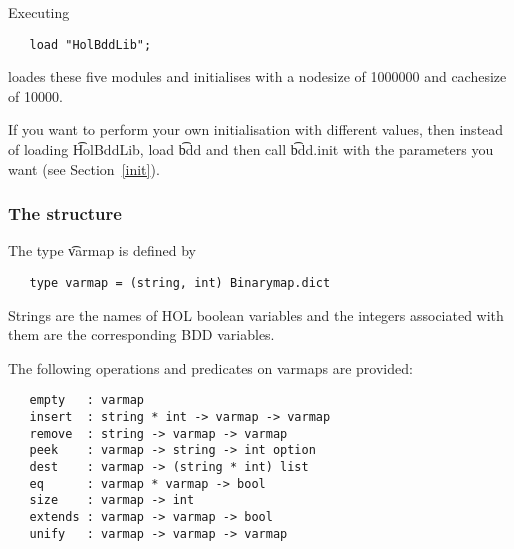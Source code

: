 Executing

\vspace*{-2mm}

\begin{verbatim}
   load "HolBddLib";
\end{verbatim}

\vspace*{-2mm}

loades these five modules and
initialises \Buddy{} with a nodesize of 1000000
and cachesize of 10000.  

If you want to perform your own \Buddy{} initialisation with different
values, then instead of loading \t{HolBddLib}, load \t{bdd} and then
call \t{bdd.init} with the parameters you want (see Section~\ref{init}).  

\subsubsection{The structure }\label{Varmap}

The type \t{varmap} is defined by

\vspace*{-2mm}

\begin{verbatim}
   type varmap = (string, int) Binarymap.dict
\end{verbatim}

\vspace*{-2mm}

Strings are the names of HOL boolean variables and the integers associated with them
are the corresponding BDD variables.

The following operations and predicates on varmaps are provided:

\begin{verbatim}
   empty   : varmap
   insert  : string * int -> varmap -> varmap
   remove  : string -> varmap -> varmap
   peek    : varmap -> string -> int option
   dest    : varmap -> (string * int) list
   eq      : varmap * varmap -> bool
   size    : varmap -> int
   extends : varmap -> varmap -> bool
   unify   : varmap -> varmap -> varmap
\end{verbatim}

